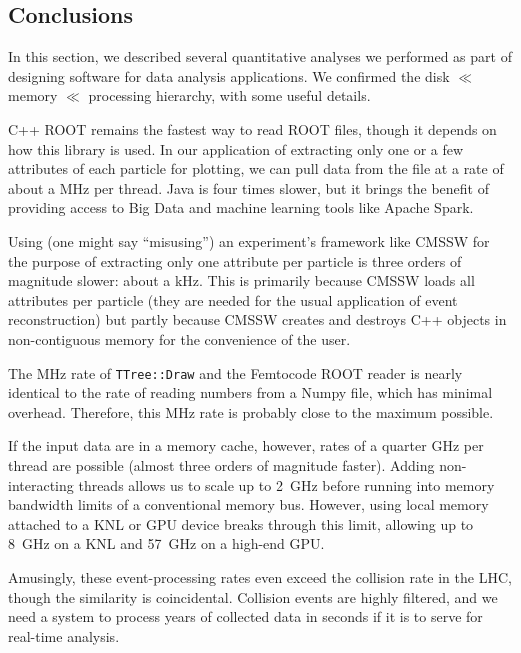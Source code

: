 \documentclass[12pt]{article}
\begin{document}
\subsection*{Conclusions}

In this section, we described several quantitative analyses we performed as part of designing software for data analysis applications. We confirmed the disk $\ll$ memory $\ll$ processing hierarchy, with some useful details.

C++ ROOT remains the fastest way to read ROOT files, though it depends on how this library is used. In our application of extracting only one or a few attributes of each particle for plotting, we can pull data from the file at a rate of about a MHz per thread. Java is four times slower, but it brings the benefit of providing access to Big Data and machine learning tools like Apache Spark.

Using (one might say ``misusing'') an experiment's framework like CMSSW for the purpose of extracting only one attribute per particle is three orders of magnitude slower: about a kHz. This is primarily because CMSSW loads all attributes per particle (they are needed for the usual application of event reconstruction) but partly because CMSSW creates and destroys C++ objects in non-contiguous memory for the convenience of the user.

The MHz rate of {\tt TTree::Draw} and the Femtocode ROOT reader is nearly identical to the rate of reading numbers from a Numpy file, which has minimal overhead. Therefore, this MHz rate is probably close to the maximum possible.

If the input data are in a memory cache, however, rates of a quarter GHz per thread are possible (almost three orders of magnitude faster). Adding non-interacting threads allows us to scale up to 2~GHz before running into memory bandwidth limits of a conventional memory bus. However, using local memory attached to a KNL or GPU device breaks through this limit, allowing up to 8~GHz on a KNL and 57~GHz on a high-end GPU.

Amusingly, these event-processing rates even exceed the collision rate in the LHC, though the similarity is coincidental. Collision events are highly filtered, and we need a system to process years of collected data in seconds if it is to serve for real-time analysis.
\end{document}
